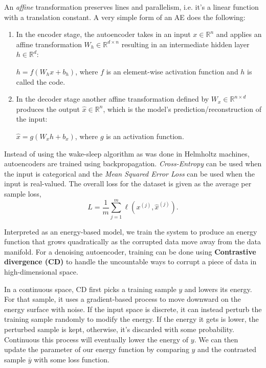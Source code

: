 \documentclass{article}
\begin{document}
An \textit{affine} transformation preserves lines and parallelism, i.e. it's a linear function with a translation constant. A very simple form of an AE does the following:

\begin{enumerate}
    \item In the encoder stage, the autoencoder takes in an input $x \in \mathbb R^n$ and applies an affine transformation $W_h \in \mathbb R^{d\times n}$ resulting in an intermediate hidden layer $h \in \mathbb R^d$:
    
    $h = f(W_h x + b_h)$, where $f$ is an element-wise activation function and $h$ is called the code.
    
    \item In the decoder stage another affine transformation defined by $W_x  \in \mathbb R^{n\times d}$ produces the output $\hat{x} \in \mathbb R^n$, which is the model's prediction/reconstruction of the input:
    
    $\hat{x} = g(W_x h + b_x)$, where $g$ is an activation function.
\end{enumerate}

Instead of using the wake-sleep algorithm as was done in Helmholtz machines, autoencoders are trained using backpropagation. \textit{Cross-Entropy} can be used when the input is categorical and the \textit{Mean Squared Error Loss} can be used when the input is real-valued. The overall loss for the dataset is given as the average per sample loss,
\[
    L = \frac{1}{m}\sum_{j=1}^m \ell (x^{(j)}, \hat x^{(j)}).
\]


Interpreted as an energy-based model, we train the system to produce an energy function that grows quadratically as the corrupted data move away from the data manifold. For a denoising autoencoder, training can be done using \textbf{Contrastive divergence (CD)} to handle the uncountable ways to corrupt a piece of data in high-dimensional space. 

In a continuous space, CD first picks a training sample $y$ and lowers its energy. For that sample, it uses a gradient-based process to move downward on the energy surface with noise. If the input space is discrete, it can instead perturb the training sample randomly to modify the energy. If the energy it gets is lower, the perturbed sample is kept, otherwise, it's discarded with some probability. Continuous this process will eventually lower the energy of $y$. We can then update the parameter of our energy function by comparing $y$ and the contrasted sample $\bar y$ with some loss function.
\end{document}
